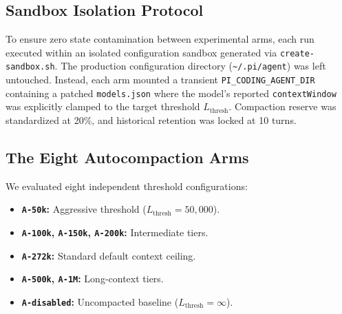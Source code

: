 \documentclass[10pt,twocolumn,a4paper]{article}
\begin{document}
\subsection{Sandbox Isolation Protocol}
To ensure zero state contamination between experimental arms, each run executed within an isolated configuration sandbox generated via \texttt{create-sandbox.sh}. The production configuration directory (\texttt{\~{}/.pi/agent}) was left untouched. Instead, each arm mounted a transient \texttt{PI\_CODING\_AGENT\_DIR} containing a patched \texttt{models.json} where the model's reported \texttt{contextWindow} was explicitly clamped to the target threshold $L_{\text{thresh}}$. Compaction reserve was standardized at 20\%, and historical retention was locked at 10 turns.

\subsection{The Eight Autocompaction Arms}
We evaluated eight independent threshold configurations:
\begin{itemize}
  \item \textbf{\texttt{A-50k}:} Aggressive threshold ($L_{\text{thresh}} = 50,000$).
  \item \textbf{\texttt{A-100k}, \texttt{A-150k}, \texttt{A-200k}:} Intermediate tiers.
  \item \textbf{\texttt{A-272k}:} Standard default context ceiling.
  \item \textbf{\texttt{A-500k}, \texttt{A-1M}:} Long-context tiers.
  \item \textbf{\texttt{A-disabled}:} Uncompacted baseline ($L_{\text{thresh}} = \infty$).
\end{itemize}
\end{document}
